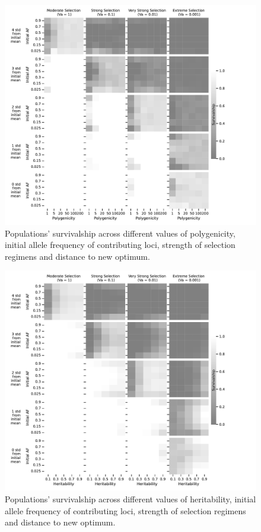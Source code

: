 \documentclass{article}
\begin{document}
\begin{figure}[b]
    \centering
    \includegraphics[width=1\textwidth]{figures/survivalshipforh2-1.pdf}
    \caption{Populations' survivalship across different values of polygenicity, initial allele frequency of contributing loci, strength of selection regimens and distance to new optimum.}
    \label{fig:survivalshipforh2}
\end{figure}

\begin{figure}[b]
    \centering
    \includegraphics[width=1\textwidth]{figures/survivalship_forpoly-1.pdf}
    \caption{Populations' survivalship across different values of heritability, initial allele frequency of contributing loci, strength of selection regimens and distance to new optimum.}
    \label{fig:survivalship_forpoly}
\end{figure}
\end{document}
